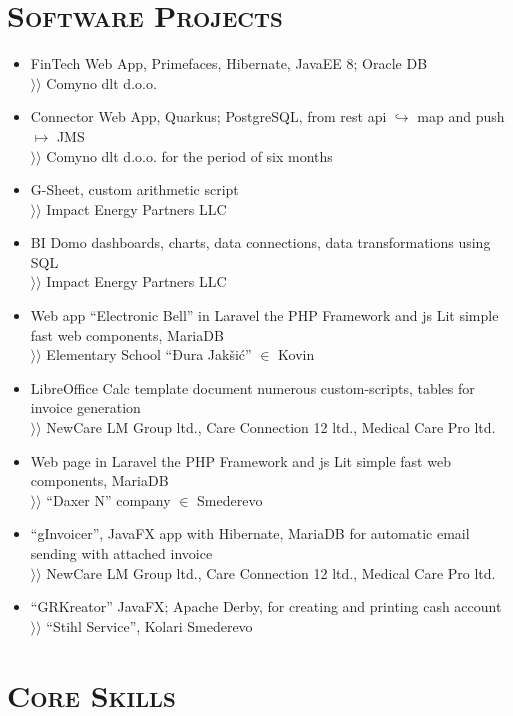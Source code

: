 \documentclass{article}
\begin{document}
\section{\textsc{Software Projects}}

\begin{itemize}[parsep=1.5pt]
\item  FinTech Web App, Primefaces, Hibernate, JavaEE 8; Oracle DB\\
$\rangle\!\rangle$ Comyno dlt d.o.o.
\item Connector Web App, Quarkus; PostgreSQL, from rest api $\hookrightarrow$ map and push $\mapsto$ JMS\\
$\rangle\!\rangle$ Comyno dlt d.o.o. for the period of six months
\item G-Sheet, custom arithmetic script\\
$\rangle\!\rangle$ Impact Energy Partners LLC
\item BI Domo dashboards, charts, data connections, data transformations using SQL\\
$\rangle\!\rangle$ Impact Energy Partners LLC
\item Web app ``Electronic Bell'' in Laravel the PHP Framework and js Lit simple fast web components, MariaDB\\
$\rangle\!\rangle$ Elementary School ``Đura Jakšić'' $\in$ Kovin
\item LibreOffice Calc template document numerous custom-scripts, tables for invoice generation\\ 
$\rangle\!\rangle$ NewCare LM Group ltd., Care Connection 12 ltd., Medical Care Pro ltd.
\item Web page in Laravel the PHP Framework and js Lit simple fast web components, MariaDB\\
$\rangle\!\rangle$ ``Daxer N'' company $\in$ Smederevo
\item ``gInvoicer'', JavaFX app with Hibernate, MariaDB for automatic email sending with attached invoice\\
$\rangle\!\rangle$ NewCare LM Group ltd., Care Connection 12 ltd., Medical Care Pro ltd.
\item ``GRKreator'' JavaFX; Apache Derby, for creating and printing cash account\\
$\rangle\!\rangle$ ``Stihl Service'', Kolari Smederevo
\end{itemize}

\section{\textsc{Core Skills}}
\end{document}

